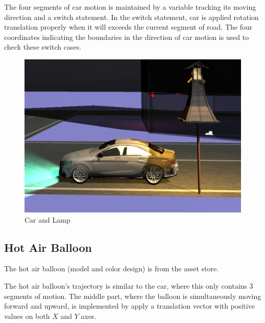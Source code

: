 \documentclass[11pt]{article}
\begin{document}
	The four segments of car motion is maintained by a variable tracking its moving direction and a switch statement. In the switch statement, car is applied rotation translation properly when it will exceeds the current segment of road. The four coordinates indicating the boundaries in the direction of car motion is used to check these switch cases.
	\begin{figure}[htbp]
		\centering
		\includegraphics[width=.45\textwidth]{fig/carlamp.png}
		\caption{Car and Lamp}
	\end{figure}
	
	\subsection{Hot Air Balloon}
	The hot air balloon (model and color design) is from the asset store\cite{hotairballoonassets}.
	
	The hot air balloon's trajectory is similar to the car, where this only contains 3 segments of motion. The middle part, where the balloon is simultaneously moving forward and upward, is implemented by apply a translation vector with positive values on both $X$ and $Y$ axes.
	
\end{document}
